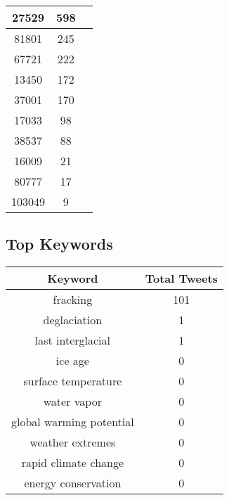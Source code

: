\documentclass{article}\usepackage[T1]{fontenc}
\begin{document}
\begin{tabular}{|c|c|c|}
 \hline
27529 & 598\\ 
 \hline
81801 & 245\\ 
 \hline
67721 & 222\\ 
 \hline
13450 & 172\\ 
 \hline
37001 & 170\\ 
 \hline
17033 & 98\\ 
 \hline
38537 & 88\\ 
 \hline
16009 & 21\\ 
 \hline
80777 & 17\\ 
 \hline
103049 & 9\\ 
 \hline
\end{tabular}\subsection*{Top Keywords}\begin{tabular}{|c|c|}         \hline         Keyword & Total Tweets \\ 
 \hline
fracking & 101\\ 
 \hline
deglaciation & 1\\ 
 \hline
last interglacial & 1\\ 
 \hline
ice age & 0\\ 
 \hline
surface temperature & 0\\ 
 \hline
water vapor & 0\\ 
 \hline
global warming potential & 0\\ 
 \hline
weather extremes & 0\\ 
 \hline
rapid climate change & 0\\ 
 \hline
energy conservation & 0\\ 
 \hline
\end{tabular}
\end{document}
